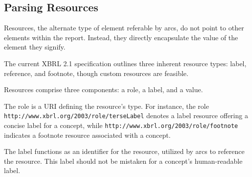 





\subsection{Parsing Resources}

Resources, the alternate type of element referable by arcs, do not point to other elements within the report.
Instead, they directly encapsulate the value of the element they signify.

The current XBRL 2.1 specification outlines three inherent resource types: label, reference, and footnote, though custom resources are feasible.

Resources comprise three components: a role, a label, and a value.

The role is a URI defining the resource's type.
For instance, the role \texttt{http://www.xbrl.org/2003/role/terseLabel} denotes a label resource offering a concise label for a concept,
while \texttt{http://www.xbrl.org/2003/role/footnote} indicates a footnote resource associated with a concept.

The label functions as an identifier for the resource, utilized by arcs to reference the resource.
This label should not be mistaken for a concept's human-readable label.

